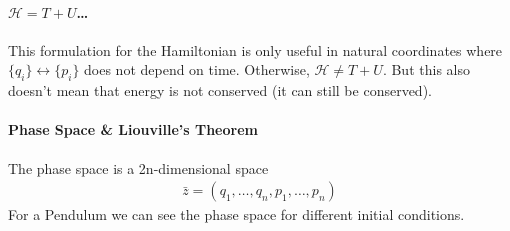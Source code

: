\documentclass[../main.tex]{subfiles}
\begin{document}
\paragraph*{$\mathcal{H} = T + U$\dots} 
This formulation for the Hamiltonian is only useful in natural coordinates where 
$\{q_i\} \leftrightarrow \{p_i\}$ does not depend on time. Otherwise, $\mathcal{H} \neq T + U$. But
this also doesn't mean that energy is not conserved (it can still be conserved).

\paragraph*{Phase Space \& Liouville's Theorem} 
The phase space is a 2n-dimensional space
\begin{align*}
    \bar z = (q_1, \dots, q_n, p_1, \dots, p_n)
\end{align*}
For a Pendulum we can see the phase space for different initial conditions. 
\end{document}
